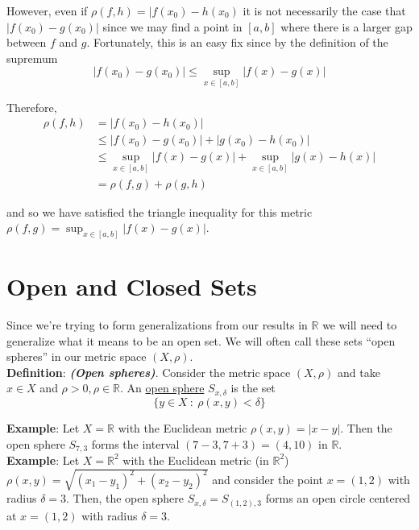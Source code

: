 \documentclass[12pt]{article}
\newlength\tindent
\renewcommand{\indent}{\hspace*{\tindent}}
\newcommand{\R}{\mathbb R}
\begin{document}
\indent However, even if $\rho(f,h) = |f(x_0) - h(x_0)$ it is not necessarily the case that $|f(x_0) - g(x_0)|$ since we may find a point in $[a,b]$ where there is a larger gap between $f$ and $g$. Fortunately, this is an easy fix since by the definition of the supremum
\begin{equation*}
	|f(x_0) - g(x_0)| \leq \sup_{x\in[a,b]} |f(x) - g(x)|
\end{equation*}

Therefore,
\begin{align*}
	\rho(f,h) &= |f(x_0) - h(x_0)| \\
	&\leq |f(x_0) - g(x_0)| + |g(x_0) - h(x_0)| \\
	&\leq \sup_{x\in[a,b]} |f(x) - g(x)| + \sup_{x\in[a,b]} |g(x) - h(x)| \\
	&= \rho(f,g) + \rho(g,h)
\end{align*}

and so we have satisfied the triangle inequality for this metric $\rho(f,g) = \sup_{x\in[a,b]} |f(x) - g(x)|$. 

\section{Open and Closed Sets}

\indent Since we're trying to form generalizations from our results in $\R$ we will need to generalize what it means to be an open set. We will often call these sets ``open spheres'' in our metric space $(X, \rho)$. \\

%
%
{\bf Definition}: {\bf \em(Open spheres)}. Consider the metric space $(X, \rho)$ and take $x \in X$ and $\rho > 0, \rho \in \R$. An \underline{open sphere} $S_{x,\delta}$ is the set
\begin{equation*}
	\{y\in X ~:~ \rho(x,y) < \delta\}
\end{equation*}

%
%
{\bf Example}: Let $X = \R$ with the Euclidean metric $\rho(x,y) = |x - y|$. Then the open sphere $S_{7,3}$ forms the interval $(7 - 3, 7 + 3) = (4, 10)$ in $\R$.  \\

%
%
{\bf Example}: Let $X = \R^2$ with the Euclidean metric (in $\R^2$) $\rho(x,y) = \sqrt{(x_1 - y_1)^2 + (x_2 - y_2)^2}$ and consider the point $x = (1, 2)$ with radius $\delta = 3$. Then, the open sphere $S_{x,\delta} = S_{(1,2), 3}$ forms an open circle centered at $x = (1,2)$ with radius $\delta = 3$. \\
\end{document}

